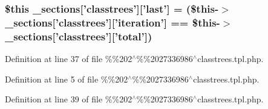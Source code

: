 {{{{{{{{{{{{{\subsubsection[{\-\_\-sections}]{\setlength{\rightskip}{0pt plus 5cm}\$this {\bf \-\_\-sections}\mbox{[}'classtrees'\mbox{]}\mbox{[}'last'\mbox{]} = (\$this-\/$>${\bf \-\_\-sections}\mbox{[}'classtrees'\mbox{]}\mbox{[}'iteration'\mbox{]} == \$this-\/$>${\bf \-\_\-sections}\mbox{[}'classtrees'\mbox{]}\mbox{[}'total'\mbox{]})}}\label{_06_06202_05_06_062027336986_05classtrees_8tpl_8php_aafcee1f4a5b3632d47ca4d3299625adc}


\-Definition at line 37 of file \%\%202$^\wedge$\%\%2027336986$^\wedge$classtrees.\-tpl.\-php.

\hypertarget{_06_06202_05_06_062027336986_05classtrees_8tpl_8php_a4a4846d8e68d455590131a05697f67a3}{
\index{\-\_\-tpl\-\_\-vars@{\-\_\-tpl\-\_\-vars}!%
\subsubsection[{\-\_\-tpl\-\_\-vars}]{\setlength{\rightskip}{0pt plus 5cm}\$this {\bf \-\_\-tpl\-\_\-vars} = \$\-\_\-smarty\-\_\-tpl\-\_\-vars}}\label{_06_06202_05_06_062027336986_05classtrees_8tpl_8php_a4a4846d8e68d455590131a05697f67a3}


\-Definition at line 5 of file \%\%202$^\wedge$\%\%2027336986$^\wedge$classtrees.\-tpl.\-php.

\hypertarget{_06_06202_05_06_062027336986_05classtrees_8tpl_8php_ae8fdc27183f296411bac00ed522ee1ac}{
\index{endfor@{endfor}!%
\subsubsection[{endfor}]{\setlength{\rightskip}{0pt plus 5cm}{\bf endfor}}}\label{_06_06202_05_06_062027336986_05classtrees_8tpl_8php_ae8fdc27183f296411bac00ed522ee1ac}


\-Definition at line 39 of file \%\%202$^\wedge$\%\%2027336986$^\wedge$classtrees.\-tpl.\-php.

}}}}}}}}}}}}}}
